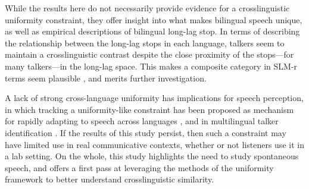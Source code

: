 While the results here do not necessarily provide evidence for a crosslinguistic uniformity constraint, they offer insight into what makes bilingual speech unique, as well as empirical descriptions of bilingual long-lag stop. In terms of describing the relationship between the long-lag stops in each language, talkers seem to maintain a crosslinguistic contrast despite the close proximity of the stops---for many talkers---in the long-lag space. This makes a composite category in SLM-r terms seem plausible \citep{flege_2021_slmr}, and merits further investigation. 

A lack of strong cross-language uniformity has implications for speech perception, in which tracking a uniformity-like constraint has been proposed as mechanism for rapidly adapting to speech across languages \citep{reinisch_2013_retune}, and in multilingual talker identification \citep{orena_2019_identifying}. If the results of this study persist, then such a constraint may have limited use in real communicative contexts, whether or not listeners use it in a lab setting. On the whole, this study highlights the need to study spontaneous speech, and offers a first pass at leveraging the methods of the uniformity framework to better understand crosslinguistic similarity.

\endinput %
